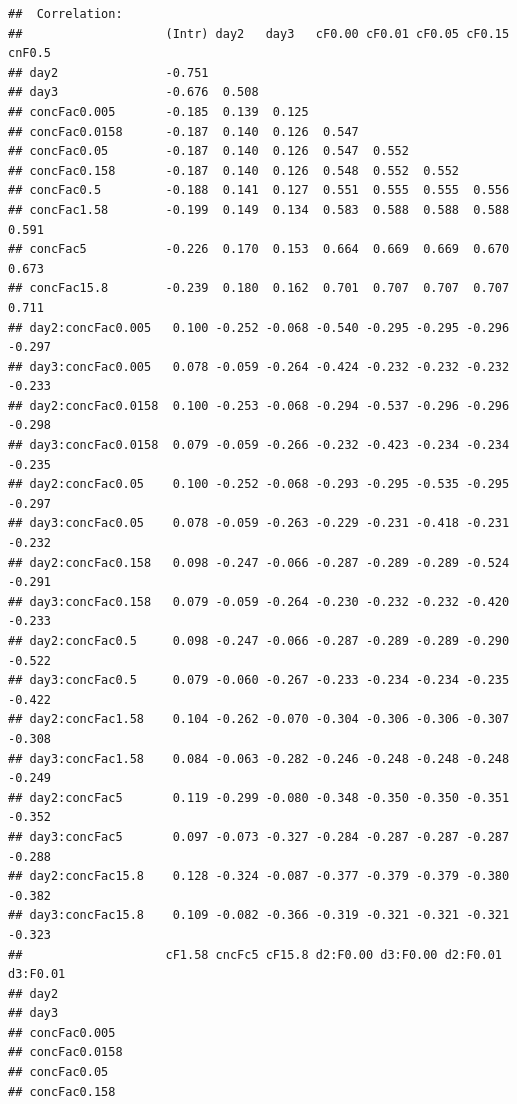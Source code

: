 \documentclass[
]{article}
\begin{document}
\begin{verbatim}
##  Correlation: 
##                    (Intr) day2   day3   cF0.00 cF0.01 cF0.05 cF0.15 cnF0.5
## day2               -0.751                                                 
## day3               -0.676  0.508                                          
## concFac0.005       -0.185  0.139  0.125                                   
## concFac0.0158      -0.187  0.140  0.126  0.547                            
## concFac0.05        -0.187  0.140  0.126  0.547  0.552                     
## concFac0.158       -0.187  0.140  0.126  0.548  0.552  0.552              
## concFac0.5         -0.188  0.141  0.127  0.551  0.555  0.555  0.556       
## concFac1.58        -0.199  0.149  0.134  0.583  0.588  0.588  0.588  0.591
## concFac5           -0.226  0.170  0.153  0.664  0.669  0.669  0.670  0.673
## concFac15.8        -0.239  0.180  0.162  0.701  0.707  0.707  0.707  0.711
## day2:concFac0.005   0.100 -0.252 -0.068 -0.540 -0.295 -0.295 -0.296 -0.297
## day3:concFac0.005   0.078 -0.059 -0.264 -0.424 -0.232 -0.232 -0.232 -0.233
## day2:concFac0.0158  0.100 -0.253 -0.068 -0.294 -0.537 -0.296 -0.296 -0.298
## day3:concFac0.0158  0.079 -0.059 -0.266 -0.232 -0.423 -0.234 -0.234 -0.235
## day2:concFac0.05    0.100 -0.252 -0.068 -0.293 -0.295 -0.535 -0.295 -0.297
## day3:concFac0.05    0.078 -0.059 -0.263 -0.229 -0.231 -0.418 -0.231 -0.232
## day2:concFac0.158   0.098 -0.247 -0.066 -0.287 -0.289 -0.289 -0.524 -0.291
## day3:concFac0.158   0.079 -0.059 -0.264 -0.230 -0.232 -0.232 -0.420 -0.233
## day2:concFac0.5     0.098 -0.247 -0.066 -0.287 -0.289 -0.289 -0.290 -0.522
## day3:concFac0.5     0.079 -0.060 -0.267 -0.233 -0.234 -0.234 -0.235 -0.422
## day2:concFac1.58    0.104 -0.262 -0.070 -0.304 -0.306 -0.306 -0.307 -0.308
## day3:concFac1.58    0.084 -0.063 -0.282 -0.246 -0.248 -0.248 -0.248 -0.249
## day2:concFac5       0.119 -0.299 -0.080 -0.348 -0.350 -0.350 -0.351 -0.352
## day3:concFac5       0.097 -0.073 -0.327 -0.284 -0.287 -0.287 -0.287 -0.288
## day2:concFac15.8    0.128 -0.324 -0.087 -0.377 -0.379 -0.379 -0.380 -0.382
## day3:concFac15.8    0.109 -0.082 -0.366 -0.319 -0.321 -0.321 -0.321 -0.323
##                    cF1.58 cncFc5 cF15.8 d2:F0.00 d3:F0.00 d2:F0.01 d3:F0.01
## day2                                                                       
## day3                                                                       
## concFac0.005                                                               
## concFac0.0158                                                              
## concFac0.05                                                                
## concFac0.158                                                               

\end{verbatim}
\end{document}
